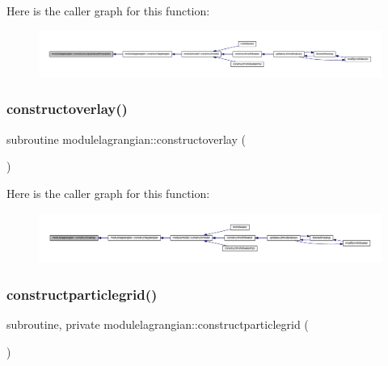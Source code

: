 Here is the caller graph for this function\+:\nopagebreak
\begin{figure}[H]
\begin{center}
\leavevmode
\includegraphics[width=350pt]{namespacemodulelagrangian_acead687ed0498394f861396d605a7ce9_icgraph}
\end{center}
\end{figure}
\mbox{\label{namespacemodulelagrangian_a9c44a52195377ea654c3cd3d5b97acca}} 
\subsubsection{\texorpdfstring{constructoverlay()}{constructoverlay()}}
{\footnotesize\ttfamily subroutine modulelagrangian\+::constructoverlay (\begin{DoxyParamCaption}{ }\end{DoxyParamCaption})\hspace{0.3cm}{\ttfamily [private]}}

Here is the caller graph for this function\+:\nopagebreak
\begin{figure}[H]
\begin{center}
\leavevmode
\includegraphics[width=350pt]{namespacemodulelagrangian_a9c44a52195377ea654c3cd3d5b97acca_icgraph}
\end{center}
\end{figure}
\mbox{\label{namespacemodulelagrangian_a190cd84669e94eedbb0ca723a973969c}} 
\subsubsection{\texorpdfstring{constructparticlegrid()}{constructparticlegrid()}}
{\footnotesize\ttfamily subroutine, private modulelagrangian\+::constructparticlegrid (\begin{DoxyParamCaption}{ }\end{DoxyParamCaption})\hspace{0.3cm}{\ttfamily [private]}}

